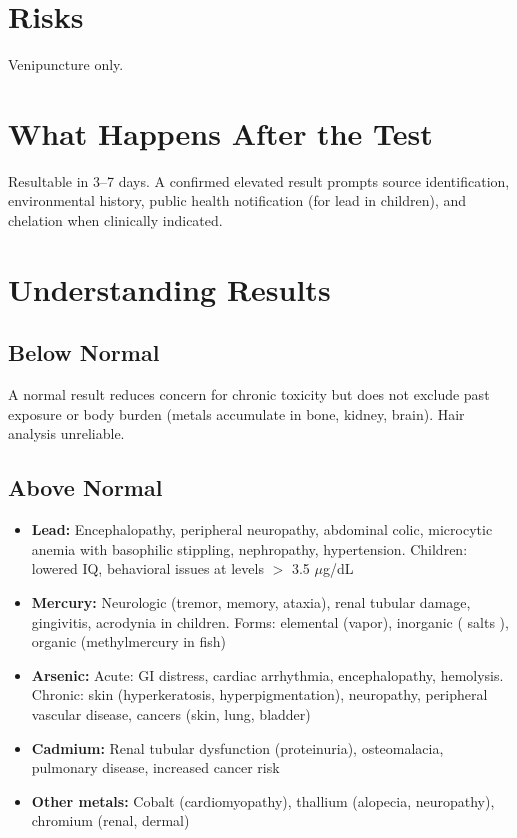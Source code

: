 \section*{Risks}
Venipuncture only.

\section*{What Happens After the Test}
Resultable in 3--7 days. A confirmed elevated result prompts source identification, environmental history, public health notification (for lead in children), and chelation when clinically indicated.

\section*{Understanding Results}

\subsection*{Below Normal}
A normal result reduces concern for chronic toxicity but does not exclude past exposure or body burden (metals accumulate in bone, kidney, brain). Hair analysis unreliable.

\subsection*{Above Normal}
\begin{itemize}
  \item \textbf{Lead:} Encephalopathy, peripheral neuropathy, abdominal colic, microcytic anemia with basophilic stippling, nephropathy, hypertension. Children: lowered IQ, behavioral issues at levels $>$ 3.5 $\mu$g/dL
  \item \textbf{Mercury:} Neurologic (tremor, memory, ataxia), renal tubular damage, gingivitis, acrodynia in children. Forms: elemental (vapor), inorganic ( salts ), organic (methylmercury in fish)
  \item \textbf{Arsenic:} Acute: GI distress, cardiac arrhythmia, encephalopathy, hemolysis. Chronic: skin (hyperkeratosis, hyperpigmentation), neuropathy, peripheral vascular disease, cancers (skin, lung, bladder)
  \item \textbf{Cadmium:} Renal tubular dysfunction (proteinuria), osteomalacia, pulmonary disease, increased cancer risk
  \item \textbf{Other metals:} Cobalt (cardiomyopathy), thallium (alopecia, neuropathy), chromium (renal, dermal)
\end{itemize}

